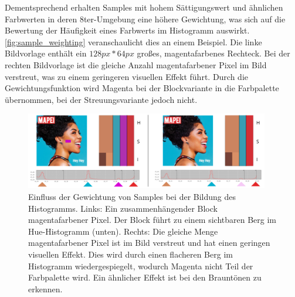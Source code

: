 Dementsprechend erhalten Samples mit hohem Sättigungswert und ähnlichen Farbwerten in deren 8ter-Umgebung eine höhere Gewichtung, was sich auf die Bewertung der Häufigkeit eines Farbwerts im Histogramm auswirkt. \autoref{fig:sample_weighting} veranschaulicht dies an einem Beispiel. Die linke Bildvorlage enthält ein $128px*64px$ großes, magentafarbenes Rechteck. Bei der rechten Bildvorlage ist die gleiche Anzahl magentafarbener Pixel im Bild verstreut, was zu einem geringeren visuellen Effekt führt. Durch die Gewichtungsfunktion wird Magenta bei der Blockvariante in die Farbpalette übernommen, bei der Streuungsvariante jedoch nicht.

\begin{figure}[]
\centering
\includegraphics[width=0.95\textwidth]{img/sample_weighting.png}
\caption{Einfluss der Gewichtung von Samples bei der Bildung des Histogramms. Links: Ein zusammenhängender Block magentafarbener Pixel. Der Block führt zu einem sichtbaren Berg im Hue-Histogramm (unten). Rechts: Die gleiche Menge magentafarbener Pixel ist im Bild verstreut und hat einen geringen visuellen Effekt. Dies wird durch einen flacheren Berg im Histogramm wiedergespiegelt, wodurch Magenta nicht Teil der Farbpalette wird. Ein ähnlicher Effekt ist bei den Brauntönen zu erkennen. }
\label{fig:sample_weighting}
\end{figure}
